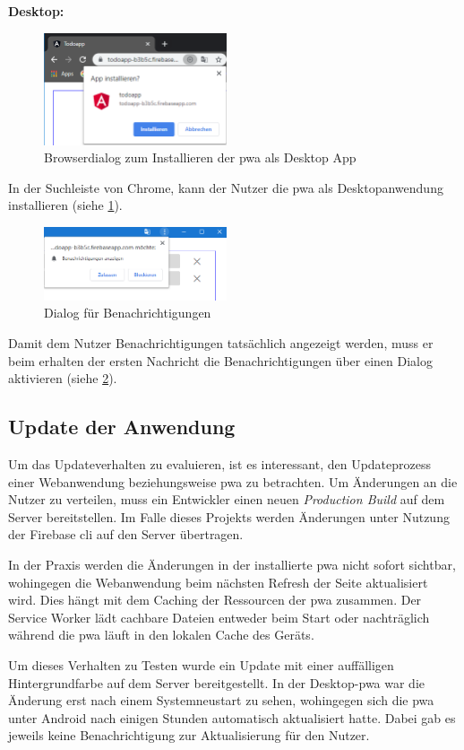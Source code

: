 \textbf{Desktop:}
\begin{figure}[h!]
	\centering
	\includegraphics[width=0.48\textwidth]{img/add_to_desktop_2.PNG}
	\caption{Browserdialog zum Installieren der \ac{pwa} als Desktop App}
	\label{fig:dialog_install_pwa_desktop}
\end{figure}
In der Suchleiste von Chrome, kann der Nutzer die \ac{pwa} als Desktopanwendung installieren (siehe \ref{fig:dialog_install_pwa_desktop}).

\begin{figure}[h!]	
	\includegraphics[width=0.48\textwidth]{img/berechtigungen_zulassen.PNG}
	\centering
	\caption{Dialog für Benachrichtigungen}
	\label{fig:pwa_benachrichtigungen_zulassen}
\end{figure}
Damit dem Nutzer Benachrichtigungen tatsächlich angezeigt werden, muss er beim erhalten der ersten Nachricht die Benachrichtigungen über einen Dialog aktivieren (siehe \ref{fig:pwa_benachrichtigungen_zulassen}).

\subsection{Update der Anwendung}

Um das Updateverhalten zu evaluieren, ist es interessant, den Updateprozess einer Webanwendung beziehungsweise \ac{pwa} zu betrachten. Um Änderungen an die Nutzer zu verteilen, muss ein Entwickler einen neuen \textit{Production Build} auf dem Server bereitstellen. Im Falle dieses Projekts werden Änderungen unter Nutzung der Firebase \ac{cli} auf den Server übertragen.

In der Praxis werden die Änderungen in der installierte \ac{pwa} nicht sofort sichtbar, wohingegen die Webanwendung beim nächsten Refresh der Seite aktualisiert wird. Dies hängt mit dem Caching der Ressourcen der \ac{pwa} zusammen. Der Service Worker lädt cachbare Dateien entweder beim Start oder nachträglich während die \ac{pwa} läuft in den lokalen Cache des Geräts.

Um dieses Verhalten zu Testen wurde ein Update mit einer auffälligen Hintergrundfarbe auf dem Server bereitgestellt. In der Desktop-\ac{pwa} war die Änderung erst nach einem Systemneustart zu sehen, wohingegen sich die \ac{pwa} unter Android nach einigen Stunden automatisch aktualisiert hatte. Dabei gab es jeweils keine Benachrichtigung zur Aktualisierung für den Nutzer.






